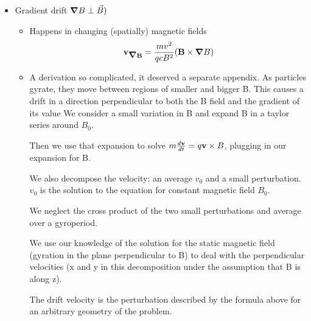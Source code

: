 \begin{itemize}
		\item Gradient drift $\mbox{\boldmath$ \nabla $} B \perp \vec{B})$
		\begin{itemize}
		\item	Happens in changing (spatially) magnetic fields
		\[\mathbf{v_{\mbox{\boldmath$ \nabla $} B}} = \frac{m v^2}{q c B^2} (\mathbf{B} \times {\ensuremath{\mbox{\boldmath$ \nabla $}} B} ) \]
			\item A derivation so complicated, it deserved a separate appendix.
			As particles gyrate, they move between regions of smaller and bigger B.
			This causes a drift in a direction perpendicular to both the B field and the gradient of its value
			We consider a small variation in B and expand B in a taylor series around $B_0$.
			
			Then we use that expansion to solve $m \frac{d \mathbf{v}}{d t} = q {\mathbf{v} \times {B}}$, plugging in our expansion for B.
			
			We also decompose the velocity: an average $v_{0}$ and a small perturbation. $v_{0}$ is the solution to the equation for constant magnetic field $B_{0}$.
			
			We neglect the cross product of the two small perturbations and average over a gyroperiod.
			
			We use our knowledge of the solution for the static magnetic field (gyration in the plane perpendicular to B) to deal with the perpendicular velocities (x and y in this decomposition under the assumption that B is along z).
			
			The drift velocity is the perturbation described by the formula above for an arbitrary geometry of the problem.
		\end{itemize}
	\end{itemize}
	
	
